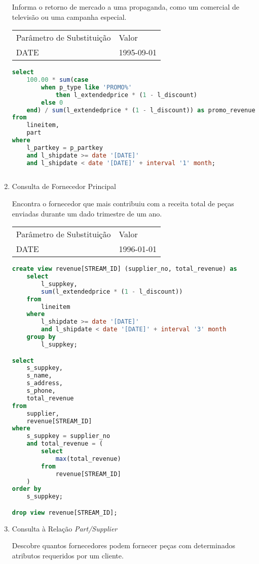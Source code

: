 \begin{enumerate}
Informa o retorno de mercado a uma propaganda, como um comercial de televisão ou uma campanha especial.

\begin{tabular}{ll}
	Parâmetro de Substituição & Valor\\
	DATE & 1995-09-01\\
\end{tabular}

	\begin{lstlisting}[language=SQL]
select
	100.00 * sum(case
		when p_type like 'PROMO%'
			then l_extendedprice * (1 - l_discount)
		else 0
	end) / sum(l_extendedprice * (1 - l_discount)) as promo_revenue
from
	lineitem,
	part
where
	l_partkey = p_partkey
	and l_shipdate >= date '[DATE]'
	and l_shipdate < date '[DATE]' + interval '1' month;
	
	\end{lstlisting}

\item Consulta de Fornecedor Principal

Encontra o fornecedor que mais contribuiu com a receita total de peças enviadas durante um dado trimestre de um ano.

\begin{tabular}{ll}
	Parâmetro de Substituição & Valor\\
	DATE & 1996-01-01\\
\end{tabular}

	\begin{lstlisting}[language=SQL]
create view revenue[STREAM_ID] (supplier_no, total_revenue) as
	select
		l_suppkey,
		sum(l_extendedprice * (1 - l_discount))
	from
		lineitem
	where
		l_shipdate >= date '[DATE]'
		and l_shipdate < date '[DATE]' + interval '3' month
	group by
		l_suppkey;

select
	s_suppkey,
	s_name,
	s_address,
	s_phone,
	total_revenue
from
	supplier,
	revenue[STREAM_ID]
where
	s_suppkey = supplier_no
	and total_revenue = (
		select
			max(total_revenue)
		from
			revenue[STREAM_ID]
	)
order by
	s_suppkey;

drop view revenue[STREAM_ID];

	\end{lstlisting}

\item Consulta à Relação \textit{Part/Supplier}

Descobre quantos fornecedores podem fornecer peças com determinados atributos requeridos por um cliente. 


\end{enumerate}
